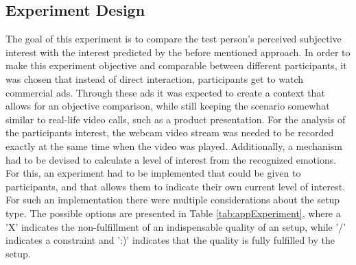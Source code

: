 \subsection{Experiment Design}
The goal of this experiment is to compare the test person's perceived subjective interest with the interest predicted by the before mentioned approach. In order to make this experiment objective and comparable between different participants, it was chosen that instead of direct interaction, participants get to watch commercial ads. Through these ads it was expected to create a context that allows for an objective comparison, while still keeping the scenario somewhat similar to real-life video calls, such as a product presentation.
\newline\newline
For the analysis of the participants interest, the webcam video stream was needed to be recorded exactly at the same time when the video was played. Additionally, a mechanism had to be devised to calculate a level of interest from the recognized emotions. For this, an experiment had to be implemented that could be given to participants, and that allows them to indicate their own current level of interest.
\newline\newline
For such an implementation there were multiple considerations about the setup type. The possible options are presented in Table \ref{tab:appExperiment}, where a 'X' indicates the non-fulfillment of an indispensable quality of an setup, while '/' indicates a constraint and ':)' indicates that the quality is fully fulfilled by the setup.

